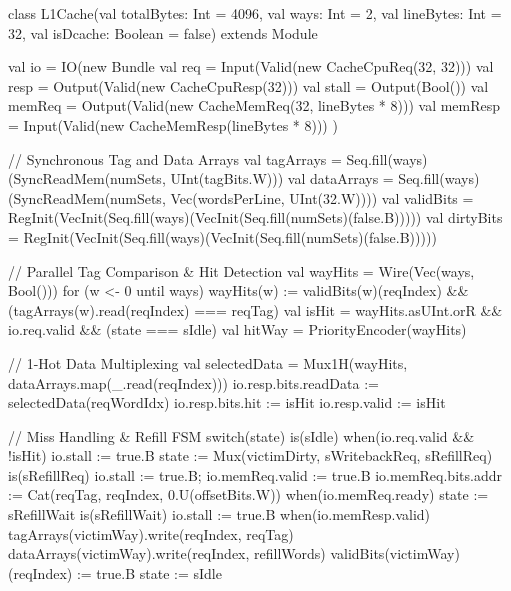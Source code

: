 \begin{chiselcode}[caption={Chisel implementation of the parameterized \texttt{L1Cache} module showing tag checking, hit multiplexing, and refill FSM.},label={lst:chisel_l1_cache}]
class L1Cache(val totalBytes: Int = 4096, val ways: Int = 2,
              val lineBytes: Int = 32, val isDcache: Boolean = false) 
    extends Module {
  val io = IO(new Bundle {
    val req      = Input(Valid(new CacheCpuReq(32, 32)))
    val resp     = Output(Valid(new CacheCpuResp(32)))
    val stall    = Output(Bool())
    val memReq   = Output(Valid(new CacheMemReq(32, lineBytes * 8)))
    val memResp  = Input(Valid(new CacheMemResp(lineBytes * 8)))
  })

  // Synchronous Tag and Data Arrays
  val tagArrays  = Seq.fill(ways)(SyncReadMem(numSets, UInt(tagBits.W)))
  val dataArrays = Seq.fill(ways)(SyncReadMem(numSets, Vec(wordsPerLine, UInt(32.W))))
  val validBits  = RegInit(VecInit(Seq.fill(ways)(VecInit(Seq.fill(numSets)(false.B)))))
  val dirtyBits  = RegInit(VecInit(Seq.fill(ways)(VecInit(Seq.fill(numSets)(false.B)))))

  // Parallel Tag Comparison & Hit Detection
  val wayHits = Wire(Vec(ways, Bool()))
  for (w <- 0 until ways) {
    wayHits(w) := validBits(w)(reqIndex) && (tagArrays(w).read(reqIndex) === reqTag)
  }
  val isHit  = wayHits.asUInt.orR && io.req.valid && (state === sIdle)
  val hitWay = PriorityEncoder(wayHits)

  // 1-Hot Data Multiplexing
  val selectedData = Mux1H(wayHits, dataArrays.map(_.read(reqIndex)))
  io.resp.bits.readData := selectedData(reqWordIdx)
  io.resp.bits.hit      := isHit
  io.resp.valid         := isHit

  // Miss Handling & Refill FSM
  switch(state) {
    is(sIdle) {
      when(io.req.valid && !isHit) {
        io.stall := true.B
        state    := Mux(victimDirty, sWritebackReq, sRefillReq)
      }
    }
    is(sRefillReq) {
      io.stall := true.B; io.memReq.valid := true.B
      io.memReq.bits.addr := Cat(reqTag, reqIndex, 0.U(offsetBits.W))
      when(io.memReq.ready) { state := sRefillWait }
    }
    is(sRefillWait) {
      io.stall := true.B
      when(io.memResp.valid) {
        tagArrays(victimWay).write(reqIndex, reqTag)
        dataArrays(victimWay).write(reqIndex, refillWords)
        validBits(victimWay)(reqIndex) := true.B
        state := sIdle
      }
    }
  }
}
\end{chiselcode}

